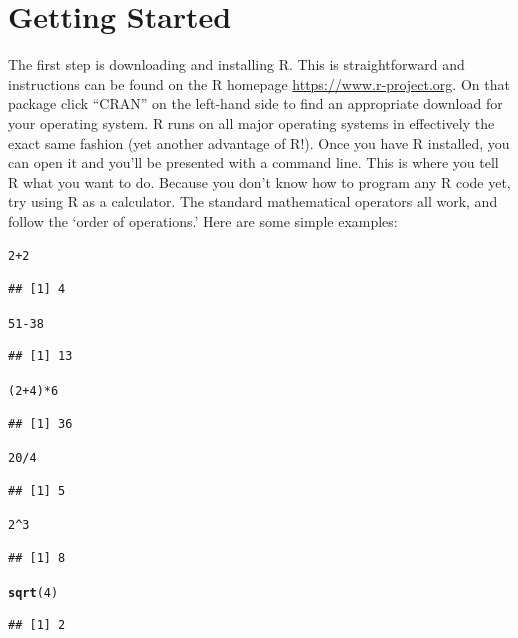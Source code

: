 \documentclass[12pt]{article}\usepackage[]{graphicx}\usepackage[]{color}
\makeatletter
\newcommand{\hlnum}[1]{\textcolor[rgb]{0.686,0.059,0.569}{#1}}%
\newcommand{\hlopt}[1]{\textcolor[rgb]{0,0,0}{#1}}%
\newcommand{\hlstd}[1]{\textcolor[rgb]{0.345,0.345,0.345}{#1}}%
\newcommand{\hlkwd}[1]{\textcolor[rgb]{0.737,0.353,0.396}{\textbf{#1}}}%
\newenvironment{kframe}{%
 \def\at@end@of@kframe{}%
 \ifinner\ifhmode%
  \def\at@end@of@kframe{\end{minipage}}%
  \begin{minipage}{\columnwidth}%
 \fi\fi%
 \def\FrameCommand##1{\hskip\@totalleftmargin \hskip-\fboxsep
 \colorbox{shadecolor}{##1}\hskip-\fboxsep
     \hskip-\linewidth \hskip-\@totalleftmargin \hskip\columnwidth}%
 \MakeFramed {\advance\hsize-\width
   \@totalleftmargin\z@ \linewidth\hsize
   \@setminipage}}%
 {\par\unskip\endMakeFramed%
 \at@end@of@kframe}
\newenvironment{knitrout}{}{} %
\makeatother
\begin{document}
\section{Getting Started}
The first step is downloading and installing R. This is straightforward and instructions can be found on the R homepage \url{https://www.r-project.org}. On that package click ``CRAN'' on the left-hand side to find an appropriate download for your operating system. R runs on all major operating systems in effectively the exact same fashion (yet another advantage of R!). Once you have R installed, you can open it and you'll be presented with a command line. This is where you tell R what you want to do. Because you don't know how to program any R code yet, try using R as a calculator. The standard mathematical operators all work, and follow the `order of operations.' Here are some simple examples: 
\begin{knitrout}
\color{fgcolor}\begin{kframe}
\begin{alltt}
\hlnum{2}\hlopt{+}\hlnum{2}
\end{alltt}
\begin{verbatim}
## [1] 4
\end{verbatim}
\begin{alltt}
\hlnum{51}\hlopt{-}\hlnum{38}
\end{alltt}
\begin{verbatim}
## [1] 13
\end{verbatim}
\begin{alltt}
\hlstd{(}\hlnum{2}\hlopt{+}\hlnum{4}\hlstd{)}\hlopt{*}\hlnum{6}
\end{alltt}
\begin{verbatim}
## [1] 36
\end{verbatim}
\begin{alltt}
\hlnum{20}\hlopt{/}\hlnum{4}
\end{alltt}
\begin{verbatim}
## [1] 5
\end{verbatim}
\begin{alltt}
\hlnum{2}\hlopt{^}\hlnum{3}
\end{alltt}
\begin{verbatim}
## [1] 8
\end{verbatim}
\begin{alltt}
\hlkwd{sqrt}\hlstd{(}\hlnum{4}\hlstd{)}
\end{alltt}
\begin{verbatim}
## [1] 2
\end{verbatim}
\end{kframe}
\end{knitrout}
\end{document}
